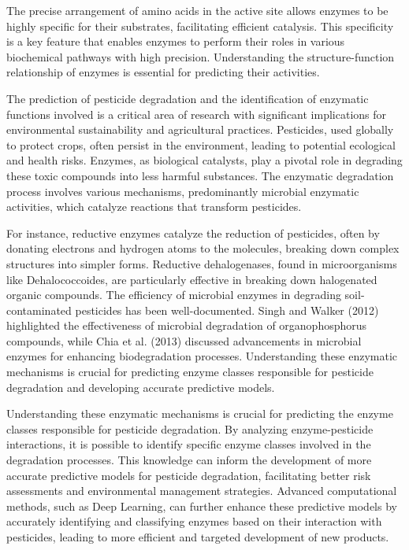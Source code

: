 The precise arrangement of amino acids in the active site allows enzymes to be highly specific for their substrates, facilitating efficient catalysis. This specificity is a key feature that enables enzymes to perform their roles in various biochemical pathways with high precision. Understanding the structure-function relationship of enzymes is essential for predicting their activities.

The prediction of pesticide degradation and the identification of enzymatic functions involved is a critical area of research with significant implications for environmental sustainability and agricultural practices. Pesticides, used globally to protect crops, often persist in the environment, leading to potential ecological and health risks. Enzymes, as biological catalysts, play a pivotal role in degrading these toxic compounds into less harmful substances. The enzymatic degradation process involves various mechanisms, predominantly microbial enzymatic activities, which catalyze reactions that transform pesticides.

For instance, reductive enzymes catalyze the reduction of pesticides, often by donating electrons and hydrogen atoms to the molecules, breaking down complex structures into simpler forms. Reductive dehalogenases, found in microorganisms like Dehalococcoides, are particularly effective in breaking down halogenated organic compounds. The efficiency of microbial enzymes in degrading soil-contaminated pesticides has been well-documented. Singh and Walker (2012) \autocite{singhMicrobialDegradationOrganophosphorus2006} highlighted the effectiveness of microbial degradation of organophosphorus compounds, while Chia et al. (2013) \autocite{chiaFunctionMicrobialEnzymes2024} discussed advancements in microbial enzymes for enhancing biodegradation processes. Understanding these enzymatic mechanisms is crucial for predicting enzyme classes responsible for pesticide degradation and developing accurate predictive models.

Understanding these enzymatic mechanisms is crucial for predicting the enzyme classes responsible for pesticide degradation. By analyzing enzyme-pesticide interactions, it is possible to identify specific enzyme classes involved in the degradation processes. This knowledge can inform the development of more accurate predictive models for pesticide degradation, facilitating better risk assessments and environmental management strategies. Advanced computational methods, such as Deep Learning, can further enhance these predictive models by accurately identifying and classifying enzymes based on their interaction with pesticides, leading to more efficient and targeted development of new products.

